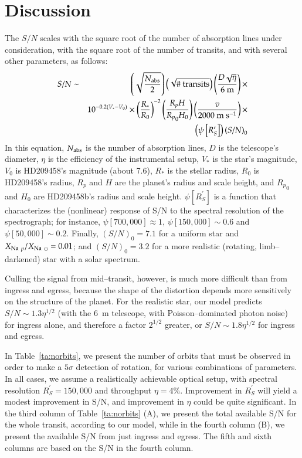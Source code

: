 \section{Discussion}
\label{rot_sec:disc}
The $S/N$ scales with the square root of the number of absorption
lines under consideration, with the square root of the number of
transits, and with several other parameters, as follows:
\begin{eqnarray}
\nonumber S/N & \sim & 
  \left( \sqrt{\frac{N_{\rm abs}}{2} } \right)
  \left( \sqrt{ \#~\rm transits} \right)
  \left( \frac{D \sqrt{\eta}}{\rm 6~m} \right) \times \\
\nonumber & &
  10^{-0.2(V_*-V_0)} \times
  \left(\frac{R_*}{R_0}\right)^{-2}
  \left(\frac{R_p H}{{R_p}_0 H_0}\right)
  \left(\frac{v}{2000 \rm~m~s^{-1}}\right) \times \\
\label{rot_eq:snscale} & &
  \left(\psi\left[R^\prime_S\right]\right)
  \left( S/N \right)_0
\end{eqnarray}
In this equation, $N_{\rm abs}$ is the number of absorption lines, $D$
is the telescope's diameter, $\eta$ is the efficiency of the
instrumental setup, $V_*$ is the star's magnitude, $V_0$ is HD209458's
magnitude (about 7.6), $R_*$ is the stellar radius, $R_0$ is
HD209458's radius, $R_p$ and $H$ are the planet's radius and scale
height, and ${R_p}_0$ and $H_0$ are HD209458b's radius and scale
height.  $\psi[R^\prime_S]$ is a function that characterizes the
(nonlinear) response of S/N to the spectral resolution of the
spectrograph; for instance, $\psi[700,000] \approx 1$, $\psi[150,000]
\sim 0.6$ and $\psi[50,000] \sim 0.2$.  Finally, $(S/N)_0 = 7.1$ for a
uniform star and ${X_{\rm Na~}}_p/{X_{\rm Na~}}_\odot = 0.01$; and
$(S/N)_0 = 3.2$ for a more realistic (rotating, limb--darkened) star
with a solar spectrum.

Culling the signal from mid--transit, however, is much more difficult
than from ingress and egress, because the shape of the distortion
depends more sensitively on the structure of the planet.  For the
realistic star, our model predicts $S/N \sim 1.3 \eta^{1/2}$ (with the
6~m telescope, with Poisson--dominated photon noise) for ingress
alone, and therefore a factor $2^{1/2}$ greater, or $S/N \sim 1.8
\eta^{1/2}$ for ingress and egress.

In Table~\ref{ta:norbits}, we present the number of orbits that must
be observed in order to make a $5\sigma$ detection of rotation, for
various combinations of parameters.  In all cases, we assume a
realistically achievable optical setup, with spectral resolution
$R^\prime_S = 150,000$ and throughput $\eta = 4\%$.  Improvement in
$R^\prime_S$ will yield a modest improvement in S/N, and improvement
in $\eta$ could be quite significant.  In the third column of
Table~\ref{ta:norbits} (A), we present the total available S/N for the
whole transit, according to our model, while in the fourth column (B),
we present the available S/N from just ingress and egress.  The fifth
and sixth columns are based on the S/N in the fourth column.

